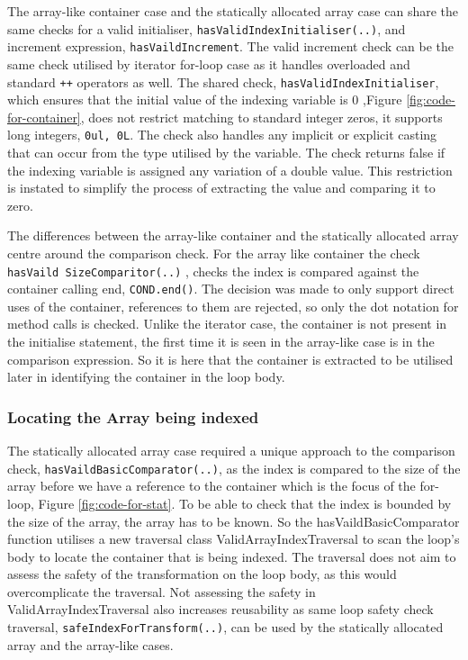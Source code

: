 \documentclass[bsc,frontabs,singlespacing,twoside,parskip,deptreport]{infthesis}
\begin{document}
The array-like container case and the statically allocated array case can share the same checks for a valid initialiser, \texttt{hasValidIndexInitialiser(..)}, and increment expression, \texttt{hasVaildIncrement}. The valid increment check can be the same check utilised by iterator for-loop case as it handles overloaded and standard \texttt{++} operators as well. The shared check, \texttt{hasValidIndexInitialiser}, which ensures that the initial value of the indexing variable is 0 ,Figure \ref{fig:code-for-container},  does not restrict matching to standard integer zeros, it supports long integers, \texttt{0ul, 0L}. The check also handles any implicit or explicit casting that can occur from the type utilised by the variable. The check returns false if the indexing variable is assigned any variation of a double value. This restriction is instated to simplify the process of extracting the value and comparing it to zero.


The differences between the array-like container and the statically allocated array centre around the comparison check. For the array like container the check \texttt{hasVaild SizeComparitor(..)} , checks the index is compared against the container calling end, \texttt{COND.end()}. The decision was made to only support direct uses of the container, references to them are rejected, so only the dot notation for method calls is checked. Unlike the iterator case, the container is not present in the initialise statement, the first time it is seen in the array-like case is in the comparison expression. So it is here that the container is extracted to be utilised later in identifying the container in the loop body.

\subsubsection{Locating the Array being indexed}

The statically allocated array case required a unique approach to the comparison check, \texttt{hasVaildBasicComparator(..)}, as the index is compared to the size of the array before we have a reference to the container which is the focus of the for-loop, Figure \ref{fig:code-for-stat}. To be able to check that the index is bounded by the size of the array, the array has to be known. So the hasVaildBasicComparator function utilises a new traversal class ValidArrayIndexTraversal to scan the loop's body to locate the container that is being indexed. The traversal does not aim to assess the safety of the transformation on the loop body, as this would overcomplicate the traversal. Not assessing the safety in ValidArrayIndexTraversal also increases reusability as same loop safety check traversal, \texttt{safeIndexForTransform(..)}, can be used by the statically allocated array and the array-like cases. 
\end{document}
